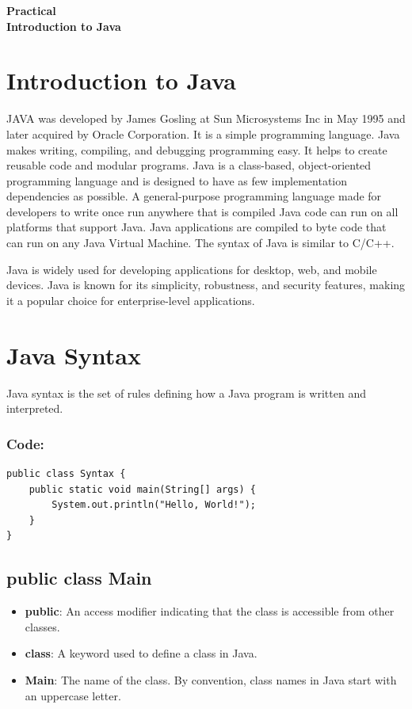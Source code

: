 \documentclass[a4paper,12pt]{article}
\newcounter{practicalno} %
\newcommand{\practicaltitle}[1]{
    \stepcounter{practicalno} %
    \newpage
    \begin{center}
        \vspace{1cm}
        \Large\textbf{Practical \thepracticalno} \\
        \vspace{0.5cm}
        \Large\textbf{#1} %
        \normalsize\vspace{1cm}
    \end{center}
}
\begin{document}
\practicaltitle{Introduction to Java}

\section{Introduction to Java}
JAVA was developed by James Gosling at Sun Microsystems Inc in May 1995 and later acquired by Oracle Corporation. It is a simple programming language. Java makes writing, compiling, and debugging programming easy. It helps to create reusable code and modular programs. Java is a class-based, object-oriented programming language and is designed to have as few implementation dependencies as possible. A general-purpose programming language made for developers to write once run anywhere that is compiled Java code can run on all platforms that support Java. Java applications are compiled to byte code that can run on any Java Virtual Machine. The syntax of Java is similar to C/C++.

Java is widely used for developing applications for desktop, web, and mobile devices. Java is known for its simplicity, robustness, and security features, making it a popular choice for enterprise-level applications.

\section{Java Syntax}
Java syntax is the set of rules defining how a Java program is written and interpreted.
\subsubsection{Code: }
\begin{lstlisting}
public class Syntax {
    public static void main(String[] args) {
        System.out.println("Hello, World!");
    }
}
\end{lstlisting}

\subsection*{public class Main}
\begin{itemize}[leftmargin=2cm]
    \item \textbf{public}: An access modifier indicating that the class is accessible from other classes.
    \item \textbf{class}: A keyword used to define a class in Java.
    \item \textbf{Main}: The name of the class. By convention, class names in Java start with an uppercase letter.
\end{itemize}
\end{document}
